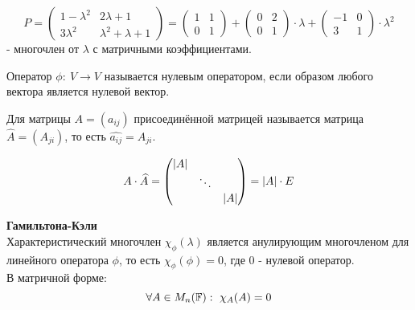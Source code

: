     \begin{example1}
        $$P = \begin{pmatrix}
        1-\lambda^2 & 2\lambda+1 \\
        3\lambda^2 & \lambda^2+\lambda+1
        \end{pmatrix} = \begin{pmatrix}
        1 & 1\\
        0 & 1
        \end{pmatrix}+\begin{pmatrix}
        0 & 2\\
        0 & 1
        \end{pmatrix}\cdot \lambda+\begin{pmatrix}
        -1 & 0\\
        3 & 1
        \end{pmatrix}\cdot \lambda^2$$
    - многочлен от $\lambda$ с матричными коэффициентами.
    \end{example1}
    \begin{definition}
        Оператор $\phi: \ V \to V$ называется нулевым оператором, если образом любого вектора является нулевой вектор.
    \end{definition}
    \begin{definition}
        Для матрицы $A = (a_{ij})$ присоединённой матрицей называется матрица $\widehat{A} = (A_{ji})$, то есть $\widehat{a_{ij}} = A_{ji}$.
    \end{definition}
    \begin{properties1}
        $$A\cdot\widehat{A} = \begin{pmatrix}
        |A|\\
        \null & \ddots\\
        \null & \null & |A|
        \end{pmatrix} = |A|\cdot E$$
    \end{properties1}
    \begin{theorem} \textbf{Гамильтона-Кэли} \\
        Характеристический многочлен $\chi_{\phi}(\lambda)$ является анулирующим многочленом для линейного оператора $\phi$, то есть $\chi_{\phi}(\phi) = 0$, где 0 - нулевой оператор.\\
        В матричной форме:
        $$\forall A\in M_n(\F): \ \chi_{A}(A) = 0$$
    \end{theorem}
